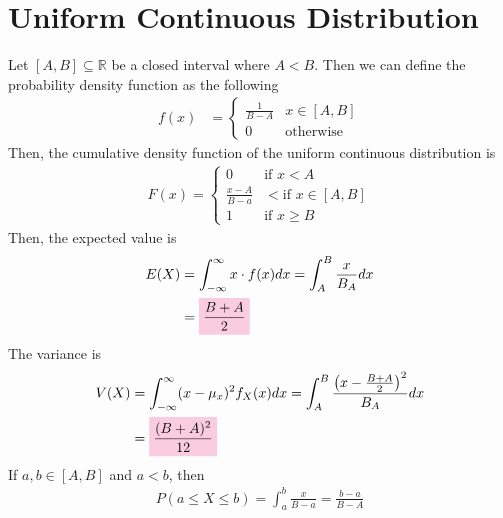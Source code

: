 \documentclass[11pt,oneside]{book}
\theoremstyle{newStyle}
\newcommand{\R}{\mathbb{R}}
\begin{document}
\section[Uniform Continuous Distribution]{Uniform Continuous Distribution}
Let $[A,B]\subseteq \R$ be a closed interval where $A<B$. Then we can define the probability density function as the following \begin{align*}
f(x)&=\begin{cases}
\frac{1}{B-A} &x\in [A,B]\\
0 &\text{otherwise}
\end{cases}
\end{align*}
Then, the cumulative density function of the uniform continuous distribution  is \begin{align*}
F(x)=\begin{cases}
0 &\text{if }x<A\\
\frac{x-A}{B-a} &<\text{if }x\in [A,B]\\
1 &\text{if } x\geq B
\end{cases}
\end{align*}
Then, the expected value is \begin{align*}
E(X)&=\int_{-\infty}^{\infty}x\cdot f(x)dx=\int_{A}^{B}\frac{x}{B_A}dx\\
&=\text{\colorbox{pink}{$\frac{B+A}{2}$}}\\
\end{align*}
The variance is \begin{align*}
V(X)&=\int_{-\infty}^{\infty}(x-\mu_x)^2f_X(x)dx=\int_{A}^{B}\frac{\left(x-\frac{B+A}{2}\right)^2}{B_A}dx\\
&=\text{\colorbox{pink}{$\frac{(B+A)^2}{12}$}}\\
\end{align*}
If $a,b\in [A,B]$ and $a<b$, then \begin{align*}
P(a\leq X\leq b)=\int_{a}^{b}\frac{x}{B-a}=\frac{b-a}{B-A}
\end{align*}
\end{document}
